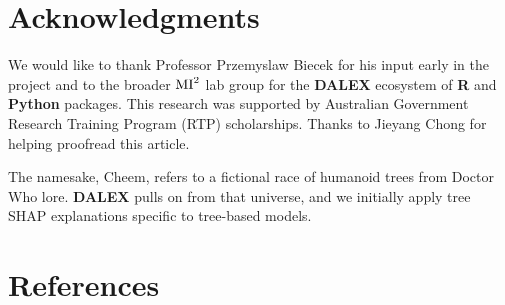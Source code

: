 \documentclass[
]{article}
\begin{document}
\hypertarget{acknowledgments}{%
\section{Acknowledgments}\label{acknowledgments}}

We would like to thank Professor Przemyslaw Biecek for his input early
in the project and to the broader \(\text{MI}^\text2\) lab group for the
\textbf{DALEX} ecosystem of \textbf{R} and \textbf{Python} packages.
This research was supported by Australian Government Research Training
Program (RTP) scholarships. Thanks to Jieyang Chong for helping
proofread this article.

The namesake, Cheem, refers to a fictional race of humanoid trees from
Doctor Who lore. \textbf{DALEX} pulls on from that universe, and we
initially apply tree SHAP explanations specific to tree-based models.

\hypertarget{references}{%
\section*{References}\label{references}}
\end{document}
